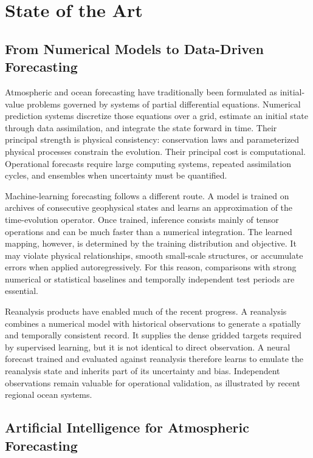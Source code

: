 \chapter{State of the Art}
\label{chap:state-of-art}

\section{From Numerical Models to Data-Driven Forecasting}

Atmospheric and ocean forecasting have traditionally been formulated as initial-value problems governed by systems of partial differential equations. Numerical prediction systems discretize those equations over a grid, estimate an initial state through data assimilation, and integrate the state forward in time. Their principal strength is physical consistency: conservation laws and parameterized physical processes constrain the evolution. Their principal cost is computational. Operational forecasts require large computing systems, repeated assimilation cycles, and ensembles when uncertainty must be quantified.

Machine-learning forecasting follows a different route. A model is trained on archives of consecutive geophysical states and learns an approximation of the time-evolution operator. Once trained, inference consists mainly of tensor operations and can be much faster than a numerical integration. The learned mapping, however, is determined by the training distribution and objective. It may violate physical relationships, smooth small-scale structures, or accumulate errors when applied autoregressively. For this reason, comparisons with strong numerical or statistical baselines and temporally independent test periods are essential.

Reanalysis products have enabled much of the recent progress. A reanalysis combines a numerical model with historical observations to generate a spatially and temporally consistent record. It supplies the dense gridded targets required by supervised learning, but it is not identical to direct observation. A neural forecast trained and evaluated against reanalysis therefore learns to emulate the reanalysis state and inherits part of its uncertainty and bias. Independent observations remain valuable for operational validation, as illustrated by recent regional ocean systems.

\section{Artificial Intelligence for Atmospheric Forecasting}

